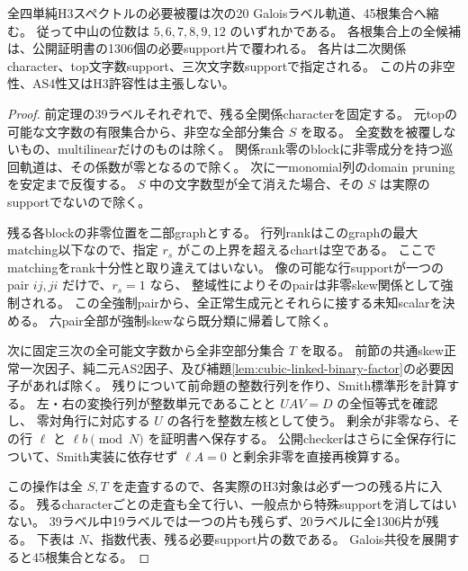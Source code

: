 \begin{theorem}
\label{thm:cubic-four-simple-twenty-support-atlas}
全四単純H3スペクトルの必要被覆は次の20 Galoisラベル軌道、45根集合へ縮む。
従って中山の位数は $5,6,7,8,9,12$ のいずれかである。
各根集合上の全候補は、公開証明書の1306個の必要support片で覆われる。
各片は二次関係character、top文字数support、三次文字数supportで指定される。
この片の非空性、AS4性又はH3許容性は主張しない。
\end{theorem}
\begin{proof}
前定理の39ラベルそれぞれで、残る全関係characterを固定する。
元topの可能な文字数の有限集合から、非空な全部分集合 $S$ を取る。
全変数を被覆しないもの、multilinearだけのものは除く。
関係rank零のblockに非零成分を持つ巡回軌道は、その係数が零となるので除く。
次に一monomial列のdomain pruningを安定まで反復する。
$S$ 中の文字数型が全て消えた場合、その $S$ は実際のsupportでないので除く。

残る各blockの非零位置を二部graphとする。
行列rankはこのgraphの最大matching以下なので、指定 $r_s$ がこの上界を超えるchartは空である。
ここでmatchingをrank十分性と取り違えてはいない。
像の可能な行supportが一つのpair $ij,ji$ だけで、$r_s=1$ なら、
整域性によりそのpairは非零skew関係として強制される。
この全強制pairから、全正常生成元とそれらに接する未知scalarを決める。
六pair全部が強制skewなら既分類に帰着して除く。

次に固定三次の全可能文字数から全非空部分集合 $T$ を取る。
前節の共通skew正常一次因子、純二元AS2因子、及び補題\ref{lem:cubic-linked-binary-factor}の必要因子があれば除く。
残りについて前命題の整数行列を作り、Smith標準形を計算する。
左・右の変換行列が整数単元であることと $UAV=D$ の全恒等式を確認し、
零対角行に対応する $U$ の各行を整数左核として使う。
剰余が非零なら、その行 $\ell$ と $\ell b\pmod N$ を証明書へ保存する。
公開checkerはさらに全保存行について、Smith実装に依存せず
$\ell A=0$ と剰余非零を直接再検算する。

この操作は全 $S,T$ を走査するので、各実際のH3対象は必ず一つの残る片に入る。
残るcharacterごとの走査も全て行い、一般点から特殊supportを消してはいない。
39ラベル中19ラベルでは一つの片も残らず、20ラベルに全1306片が残る。
下表は $N$、指数代表、残る必要support片の数である。
Galois共役を展開すると45根集合となる。
\end{proof}

